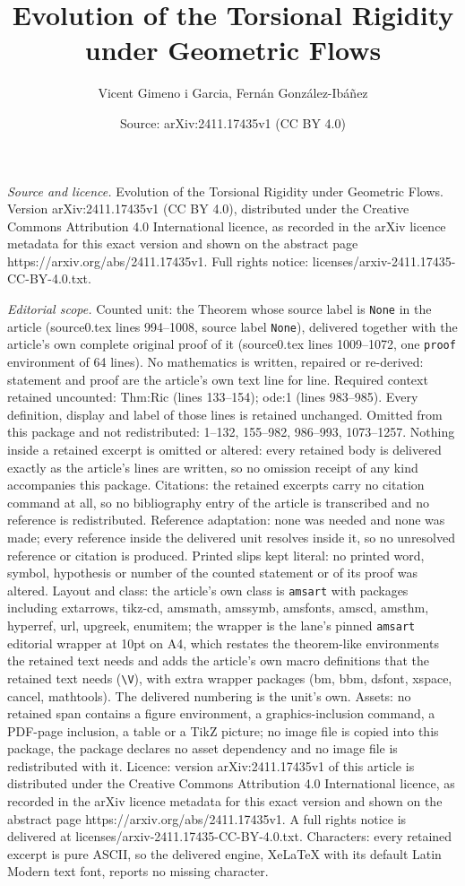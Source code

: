 \documentclass[10pt,a4paper]{amsart}
\title[Evolution of the Torsional Rigidity under Geometric Flows]{Evolution of the Torsional Rigidity under Geometric Flows}
\author{Vicent Gimeno i Garcia, Fern\'an Gonz\'alez-Ib\'a\~nez}
\date{Source: arXiv:2411.17435v1 (CC BY 4.0)}
\begin{document}
\maketitle

\noindent\emph{Source and licence.} Evolution of the Torsional Rigidity under Geometric Flows. Version arXiv:2411.17435v1 (CC BY 4.0), distributed under the Creative Commons Attribution 4.0 International licence, as recorded in the arXiv licence metadata for this exact version and shown on the abstract page https://arxiv.org/abs/2411.17435v1. Full rights notice: licenses/arxiv-2411.17435-CC-BY-4.0.txt.\par\smallskip

\noindent\textit{Editorial scope.} Counted unit: the Theorem whose source label is \texttt{None} in the article (source0.tex lines 994--1008, source label \texttt{None}), delivered together with the article's own complete original proof of it (source0.tex lines 1009--1072, one \texttt{proof} environment of 64 lines). No mathematics is written, repaired or re-derived: statement and proof are the article's own text line for line. Required context retained uncounted: Thm:Ric (lines 133--154); ode:1 (lines 983--985). Every definition, display and label of those lines is retained unchanged. Omitted from this package and not redistributed: 1--132, 155--982, 986--993, 1073--1257. Nothing inside a retained excerpt is omitted or altered: every retained body is delivered exactly as the article's lines are written, so no omission receipt of any kind accompanies this package. Citations: the retained excerpts carry no citation command at all, so no bibliography entry of the article is transcribed and no reference is redistributed. Reference adaptation: none was needed and none was made; every reference inside the delivered unit resolves inside it, so no unresolved reference or citation is produced. Printed slips kept literal: no printed word, symbol, hypothesis or number of the counted statement or of its proof was altered. Layout and class: the article's own class is \texttt{amsart} with packages including extarrows, tikz-cd, amsmath, amssymb, amsfonts, amscd, amsthm, hyperref, url, upgreek, enumitem; the wrapper is the lane's pinned \texttt{amsart} editorial wrapper at 10pt on A4, which restates the theorem-like environments the retained text needs and adds the article's own macro definitions that the retained text needs (\texttt{\textbackslash V}), with extra wrapper packages (bm, bbm, dsfont, xspace, cancel, mathtools). The delivered numbering is the unit's own. Assets: no retained span contains a figure environment, a graphics-inclusion command, a PDF-page inclusion, a table or a TikZ picture; no image file is copied into this package, the package declares no asset dependency and no image file is redistributed with it. Licence: version arXiv:2411.17435v1 of this article is distributed under the Creative Commons Attribution 4.0 International licence, as recorded in the arXiv licence metadata for this exact version and shown on the abstract page https://arxiv.org/abs/2411.17435v1. A full rights notice is delivered at licenses/arxiv-2411.17435-CC-BY-4.0.txt. Characters: every retained excerpt is pure ASCII, so the delivered engine, XeLaTeX with its default Latin Modern text font, reports no missing character.
\end{document}
